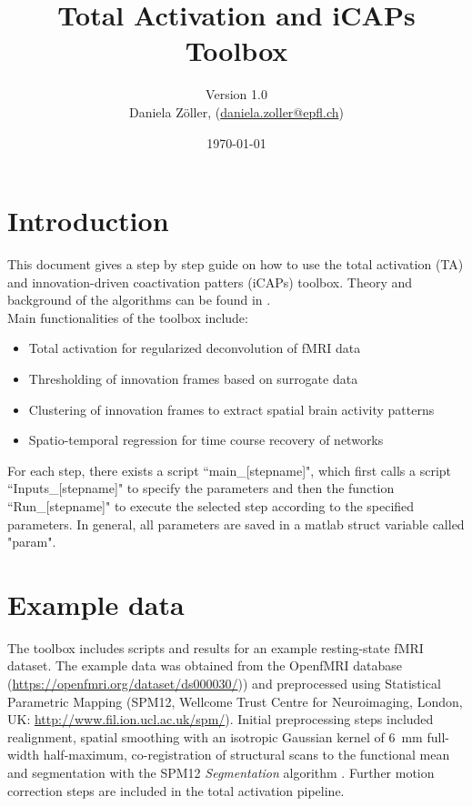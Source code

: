 \documentclass{article}
\newcommand{\texcountinc}{%
  \immediate\write18{texcount -inc \jobname.tex > \jobname.wcdetail }%
}
\begin{document}

\title{Total Activation and iCAPs Toolbox}
\author{Version 1.0\\Daniela Zöller, (\href{daniela.zoller@epfl.ch}{daniela.zoller@epfl.ch})}
\date{\today}

\maketitle

\tableofcontents


\section{Introduction}
This document gives a step by step guide on how to use the total activation (TA) and innovation-driven coactivation patters (iCAPs) toolbox. Theory and background of the algorithms can be found in \cite{Karahanoglu2011,Karahanoglu2013,Karahanoglu2015,Farouj2017,Zoller2018}.\\
Main functionalities of the toolbox include:
\begin{itemize}
\item Total activation for regularized deconvolution of fMRI data
\item Thresholding of innovation frames based on surrogate data
\item Clustering of innovation frames to extract spatial brain activity patterns
\item Spatio-temporal regression for time course recovery of networks
\end{itemize}

For each step, there exists a script ``main\_[stepname]", which first calls a script ``Inputs\_[stepname]" to specify the parameters and then the function ``Run\_[stepname]" to execute the selected step according to the specified parameters. In general, all parameters are saved in a matlab struct variable called "param".

\section{Example data}
The toolbox includes scripts and results for an example resting-state fMRI dataset. The example data was obtained from the OpenfMRI database (\href{https://openfmri.org/dataset/ds000030/)}{https://openfmri.org/dataset/ds000030/})) \cite{Poldrack2016} and preprocessed using Statistical Parametric Mapping (SPM12, Wellcome Trust Centre for Neuroimaging, London, UK: \href{http://www.fil.ion.ucl.ac.uk/spm/)}{http://www.fil.ion.ucl.ac.uk/spm/}). Initial preprocessing steps included realignment, spatial smoothing with an isotropic Gaussian kernel of \SI{6}{\milli\meter} full-width half-maximum, co-registration of structural scans to the functional mean and segmentation with the SPM12 \textit{Segmentation} algorithm \cite{Ashburner2005}. Further motion correction steps are included in the total activation pipeline.
\end{document}
